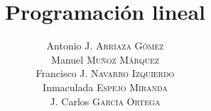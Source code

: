 \title{Programación lineal}
\author{Antonio J. \textsc{Arriaza Gómez}\\
Manuel \textsc{Muñoz Márquez}\\
Francisco J. \textsc{Navarro Izquierdo}\\
Inmaculada \textsc{Espejo Miranda} \\
J. Carlos \textsc{García Ortega}}



\usepackage[utf8]{inputenc}
\usepackage[spanish]{babel}

\usepackage[sfdefault,condensed]{roboto}
\usepackage[T1]{fontenc}

\usepackage{blkarray, bigstrut}
\usepackage{multirow}

\def\IR{\ensuremath{\mathbb R}}
\def\IK{\ensuremath{\mathbb K}}
\def\IC{\ensuremath{\mathbb C}}
\def\IN{\ensuremath{\mathbb N}}
\def\IZ{\ensuremath{\mathbb Z}}
\def\IQ{\ensuremath{\mathbb Q}}
\def\IA{\ensuremath{\mathbb A}}

\usepackage{multicol}
\usepackage{forloop}
\usepackage{calculator}

\def\fin{\multicolumn{1}{c}}
	
\newenvironment{simplex}[4]
{ 
	\def\myslines{} %
	\forloop{ct}{0}{\value{ct} < #1}{\expandafter\def\expandafter\myslines\expandafter{%
			\myslines r
		}
	}
	\ADD{#1}{3}{\sol}
	\begin{array}{rr|\myslines|c}
		& \multicolumn{1}{c}{} &#2&\\
		& & #3\\
		\cline{2-\sol}
		#4
		\cline{2-\sol}
		& & }
{\\\end{array}}

\graphicspath{{graficos/}}


\newenvironment{formulacion}[4][1]
{ 
  \def\myflines{} %
  \forloop{ct}{-2}{\value{ct} < #3}{\expandafter\def\expandafter\myflines\expandafter{%
      \myflines
      r
    }%
  }
  \begin{array}{c}
    #2 \quad #4\vspace*{0.3cm}\\
    \text{s.a}\;
    \left\{
    \renewcommand{\arraystretch}{1.2}
    \begin{array}{\myflines}}
      {\end{array}\right.
  \end{array}
}